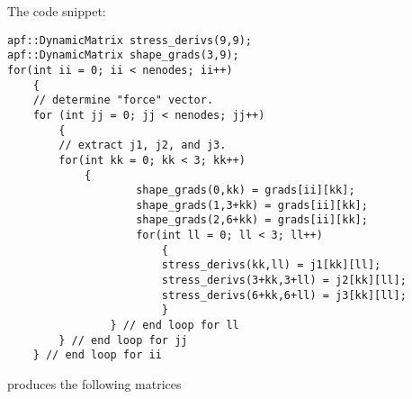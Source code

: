 The code snippet:
%
\begin{lstlisting}
apf::DynamicMatrix stress_derivs(9,9);                                                                                                                                                                            
apf::DynamicMatrix shape_grads(3,9);
for(int ii = 0; ii < nenodes; ii++)
	{
	// determine "force" vector.
	for (int jj = 0; jj < nenodes; jj++)
		{
		// extract j1, j2, and j3.
		for(int kk = 0; kk < 3; kk++)
			{
            		shape_grads(0,kk) = grads[ii][kk];
            		shape_grads(1,3+kk) = grads[ii][kk];
            		shape_grads(2,6+kk) = grads[ii][kk];
            		for(int ll = 0; ll < 3; ll++)
            			{
              	 		stress_derivs(kk,ll) = j1[kk][ll];
              	 		stress_derivs(3+kk,3+ll) = j2[kk][ll];
              	 		stress_derivs(6+kk,6+ll) = j3[kk][ll];
            			}
          		} // end loop for ll
		} // end loop for jj
	} // end loop for ii
\end{lstlisting}
%
produces the following matrices
%
